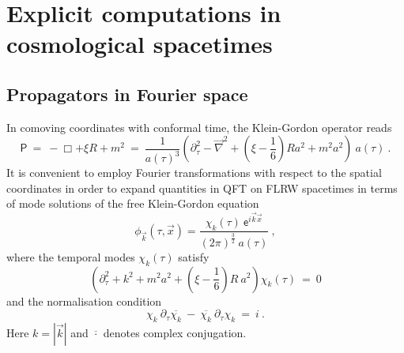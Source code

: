 \documentclass[12pt]{book}
\newcommand{\abs}[1]{\left|#1\right|}
\newcommand{\Psf}{\mathsf{P}}
\newcommand{\esf}{\mathsf{e}}
\theoremstyle{break}
\begin{document}
\section{Explicit computations in cosmological spacetimes}


\subsection{Propagators in Fourier space}


In comoving coordinates with conformal time, the Klein-Gordon operator reads
%
\begin{equation*}
\Psf \ = \ - \Box + \xi R + m^2 \ = \ \frac{1}{a(\tau)^3} \left(\partial^2_\tau-\vec{\nabla}^2 + \left(\xi-\frac16\right)R a^2+m^2a^2\right) \ a(\tau) \ .
\end{equation*}
%
It is convenient to employ Fourier transformations with respect to the spatial coordinates in order to expand quantities in QFT on FLRW spacetimes in terms of mode solutions of the free Klein-Gordon equation
%
\begin{equation*}
\phi_{\vec{k}}(\tau,\vec{x}) = \frac{\chi_k(\tau) \ \esf^{i\vec{k}\vec{x}}}{(2\pi)^{\frac32} \ a(\tau)} \ , 
\end{equation*}
%
where the temporal modes $\chi_k(\tau)$ satisfy
%
\begin{equation}
\left(\partial^2_\tau + k^2 + m^2 a^2 + \left( \xi - \frac16 \right) R \ a^2 \right) \chi_k(\tau) \ = \ 0
\label{eq:modes}
\end{equation}
%
and the normalisation condition
%
\begin{equation}
\chi_k \ \partial_\tau \overline{\chi_k} \ - \ \overline{\chi_k} \ \partial_\tau{\chi_k} \ = \ i \ .
\label{eq:modes_normal}
\end{equation}
%
Here $k = \abs{\vec{k}}$ and $\overline{\cdot}$ denotes complex conjugation.
\end{document}

